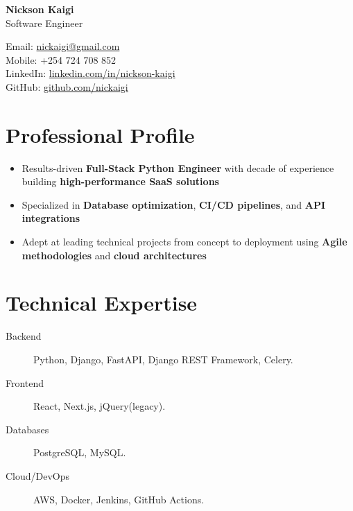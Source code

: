 \documentclass[11pt]{article} %
\begin{document}
\begin{center}
    \begin{minipage}{0.5\textwidth}
    {\Huge\bfseries
        Nickson Kaigi
        } \\ \medskip
        Software Engineer
    \end{minipage} \hfill
    \begin{minipage}{0.4\textwidth}
        \raggedleft
        Email: \href{mailto:nickaigi@gmail.com}{nickaigi@gmail.com} \\
        Mobile: +254 724 708 852 \\
        LinkedIn: \href{https://www.linkedin.com/in/nickson-kaigi/}{linkedin.com/in/nickson-kaigi} \\
        GitHub: \href{https://github.com/nickaigi}{github.com/nickaigi}
    \end{minipage}
\end{center}

\section{Professional Profile}
\begin{itemize}
    \item Results-driven \textbf{Full-Stack Python Engineer} with decade of experience building \textbf{high-performance SaaS solutions}
    \item Specialized in \textbf{Database optimization}, \textbf{CI/CD pipelines}, and \textbf{API integrations}
    \item Adept at leading technical projects from concept to deployment using \textbf{Agile methodologies} and \textbf{cloud architectures}
\end{itemize}

\section{Technical Expertise}
\begin{description}
    \item[Backend] Python, Django, FastAPI, Django REST Framework, Celery.
    \item[Frontend] React, Next.js, jQuery(legacy).
    \item[Databases] PostgreSQL, MySQL.
    \item[Cloud/DevOps] AWS, Docker, Jenkins, GitHub Actions.
\end{description}
\end{document}
